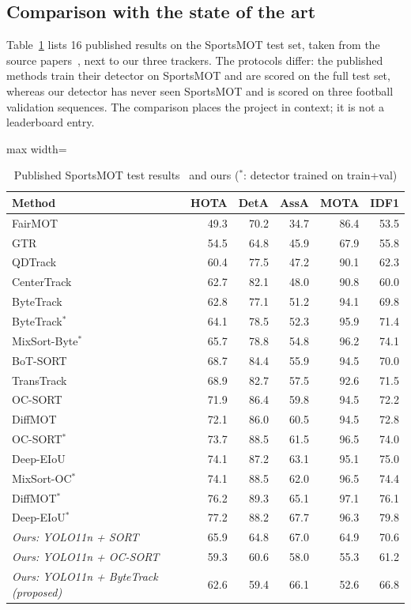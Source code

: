 \documentclass[conference]{IEEEtran}
\begin{document}
\subsection{Comparison with the state of the art}
Table~\ref{tab:sota} lists 16 published results on the SportsMOT test
set, taken from the source papers~\cite{sportsmot,deepeiou,diffmot}, next to our
three trackers. The protocols differ: the published methods train their detector
on SportsMOT and are scored on the full test set, whereas our detector has never
seen SportsMOT and is scored on three football validation sequences. The
comparison places the project in context; it is not a leaderboard entry.

\begin{table}[!htb]
\caption{Published SportsMOT test results~\cite{sportsmot,deepeiou,diffmot}
and ours ($^{*}$: detector trained on train+val)}
\label{tab:sota}
\centering
\footnotesize
\begin{adjustbox}{max width=\columnwidth}
\begin{tabular}{@{}lrrrrr@{}}
\toprule
Method & HOTA & DetA & AssA & MOTA & IDF1 \\
\midrule
FairMOT & 49.3 & 70.2 & 34.7 & 86.4 & 53.5 \\
GTR & 54.5 & 64.8 & 45.9 & 67.9 & 55.8 \\
QDTrack & 60.4 & 77.5 & 47.2 & 90.1 & 62.3 \\
CenterTrack & 62.7 & 82.1 & 48.0 & 90.8 & 60.0 \\
ByteTrack & 62.8 & 77.1 & 51.2 & 94.1 & 69.8 \\
ByteTrack$^{*}$ & 64.1 & 78.5 & 52.3 & 95.9 & 71.4 \\
MixSort-Byte$^{*}$ & 65.7 & 78.8 & 54.8 & 96.2 & 74.1 \\
BoT-SORT & 68.7 & 84.4 & 55.9 & 94.5 & 70.0 \\
TransTrack & 68.9 & 82.7 & 57.5 & 92.6 & 71.5 \\
OC-SORT & 71.9 & 86.4 & 59.8 & 94.5 & 72.2 \\
DiffMOT & 72.1 & 86.0 & 60.5 & 94.5 & 72.8 \\
OC-SORT$^{*}$ & 73.7 & 88.5 & 61.5 & 96.5 & 74.0 \\
Deep-EIoU & 74.1 & 87.2 & 63.1 & 95.1 & 75.0 \\
MixSort-OC$^{*}$ & 74.1 & 88.5 & 62.0 & 96.5 & 74.4 \\
DiffMOT$^{*}$ & 76.2 & 89.3 & 65.1 & 97.1 & 76.1 \\
Deep-EIoU$^{*}$ & 77.2 & 88.2 & 67.7 & 96.3 & 79.8 \\
\midrule
\textit{Ours: YOLO11n + SORT} & 65.9 & 64.8 & 67.0 & 64.9 & 70.6 \\
\textit{Ours: YOLO11n + OC-SORT} & 59.3 & 60.6 & 58.0 & 55.3 & 61.2 \\
\textit{Ours: YOLO11n + ByteTrack (proposed)} & 62.6 & 59.4 & 66.1 & 52.6 & 66.8 \\
\bottomrule
\end{tabular}
\end{adjustbox}
\end{table}
\end{document}
